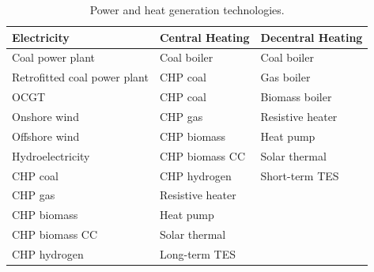 \documentclass[preprint,12pt]{elsarticle}
\begin{document}
\begin{table}[htbp]
  \centering
  \caption{Power and heat generation technologies.}
  \label{tab:power_heat_generation_technologies}
  \footnotesize %
  \setlength{\tabcolsep}{3pt} %
  \begin{tabular}{lll}
    \hline
    Electricity                  & Central Heating  & Decentral Heating \\ \hline
    Coal power plant             & Coal boiler      & Coal boiler       \\
    Retrofitted coal power plant & CHP coal         & Gas boiler        \\
    OCGT                         & CHP coal         & Biomass boiler    \\
    Onshore wind                 & CHP gas          & Resistive heater  \\
    Offshore wind                & CHP biomass      & Heat pump         \\
    Hydroelectricity             & CHP biomass CC   & Solar thermal     \\
    CHP coal                     & CHP hydrogen     & Short-term TES    \\
    CHP gas                      & Resistive heater &                   \\
    CHP biomass                  & Heat pump        &                   \\
    CHP biomass CC               & Solar thermal    &                   \\
    CHP hydrogen                 & Long-term TES    &                   \\ \hline
    \end{tabular}
\end{table}
\end{document}
